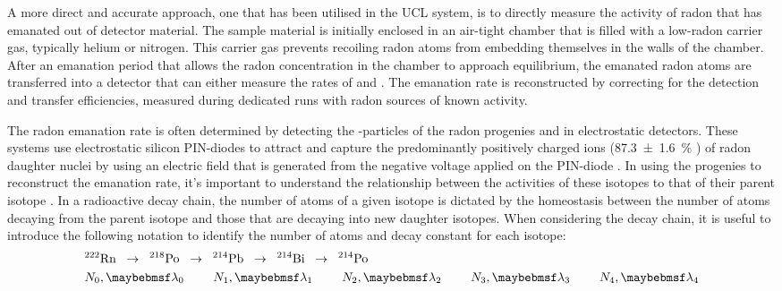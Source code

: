 A more direct and accurate approach, one that has been utilised in the UCL system, is to directly measure the activity of radon that has emanated out of detector material. The sample material is initially enclosed in an air-tight chamber that is filled with a low-radon carrier gas, typically helium or nitrogen. This carrier gas prevents recoiling radon atoms from embedding themselves in the walls of the chamber.  After an emanation period that allows the radon concentration in the chamber to approach equilibrium, the emanated radon atoms are transferred into a detector that can either measure the rates of \PoTOE{} and \PoTOF{}. The emanation rate is reconstructed by correcting for the detection and transfer efficiencies, measured during dedicated runs with radon sources of known activity. 

The radon emanation rate is often determined by detecting the \alpha-particles of the radon progenies \PoTOE and \PoTOF{} in electrostatic detectors. These systems use electrostatic silicon PIN-diodes to attract and capture the predominantly positively charged ions (\SI{87.3\pm1.6}{\percent} \cite{PAGELKOPF20031057}) of radon daughter nuclei by using an electric field that is generated from the negative voltage applied on the PIN-diode \cite{CHOI2001177}. In using the progenies to reconstruct the emanation rate, it's important to understand the relationship between the activities of these isotopes to that of their parent isotope \RnTTT{}. In a radioactive decay chain, the number of atoms of a given isotope is dictated by the homeostasis between the number of atoms decaying from the parent isotope and those that are decaying into new daughter isotopes. When considering the decay chain, it is useful to introduce the following notation to identify the number of atoms and decay constant for each isotope:
%
\begin{align*}
    &^{222}\MathText{Rn} \;\; \rightarrow \;\; ^{218}\MathText{Po} \;\; \rightarrow \;\; ^{214}\MathText{Pb} \;\; \rightarrow \;\; ^{214}\MathText{Bi} \;\; \rightarrow \;\; ^{214}\MathText{Po} \\
    &N_{0}, \lambda{}_{0} \,\,\,\,\,\,\,\,\,\,\,\,\,\,
    N_{1}, \lambda{}_{1} \,\,\,\,\,\,\,\,\,\,\,\,\,\,
    N_{2}, \lambda{}_{2} \,\,\,\,\,\,\,\,\,\,\,\,\,\,
    N_{3}, \lambda{}_{3} \,\,\,\,\,\,\,\,\,\,\,\,\,\,
    N_{4}, \lambda{}_{4} 
    \label{eq:radon_decay_chain}
\end{align*}
%

